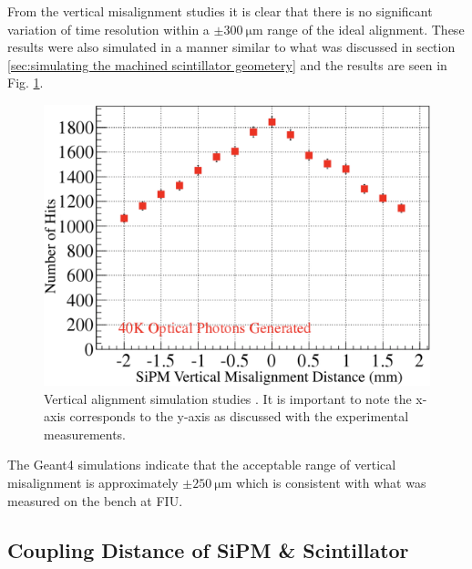 From the vertical misalignment studies it is clear that there is no significant variation of time resolution within a $\pm 300\ \mathrm{\mu m}$ range of the ideal alignment.  These results were also simulated in a manner similar to what was discussed in section \ref{sec:simulating the machined scintillator geometery} and the results are seen in Fig. \ref{fig:vertical_sim}.
\begin{figure}[!htb]
	\centering
	\includegraphics[width=1.0\columnwidth]{misalignment/figs/vertical_sim}
	\caption{Vertical alignment simulation studies \cite{puneet_sim_talk}.  It is important to note the x-axis corresponds to the y-axis as discussed with the experimental measurements.}
	\label{fig:vertical_sim}
\end{figure}
The Geant4 simulations indicate that the acceptable range of vertical misalignment is approximately $\pm 250\ \mathrm{\mu m}$ \cite{puneet_sim_talk} which is consistent with what was measured on the bench at FIU.

\subsection{Coupling Distance of SiPM \& Scintillator}


